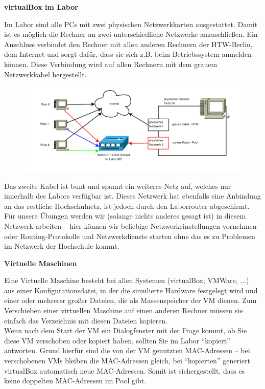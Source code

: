\documentclass[paper=a4,fontsize=11pt]{scrartcl}%
\numberwithin{equation}{section}
\begin{document}
\begin{center}
\Large{\textbf{virtualBox im Labor}}
\end{center}
Im Labor sind alle PCs mit zwei physischen Netzwerkkarten ausgestattet. Damit ist es möglich die Rechner an zwei unterschiedliche Netzwerke anzuschließen. Ein Anschluss verbindet den Rechner mit allen anderen Rechnern der HTW-Berlin, dem Internet und sorgt dafür, dass sie sich z.B. beim Betriebssystem anmelden können. Diese Verbindung wird auf allen Rechnern mit dem grauem Netzwerkkabel hergestellt.
\begin{figure}[H]
	\centering
	\includegraphics[scale=0.4]{wh_c_625}
\end{figure}
Das zweite Kabel ist bunt und spannt ein weiteres Netz auf, welches nur innerhalb des Labors verfügbar ist. Dieses Netzwerk hat ebenfalls eine Anbindung an das restliche Hochschulnetz, ist jedoch durch den Laborrouter abgeschirmt. Für unsere Übungen werden wir (solange nichts anderes gesagt ist) in diesem Netzwerk arbeiten -- hier können wir beliebige Netzwerkeinstellungen vornehmen oder Routing-Protokolle und Netzwerkdienste starten ohne das es zu Problemen im Netzwerk der Hochschule kommt.
\begin{center}
\Large{\textbf{Virtuelle Maschinen}}
\end{center}
Eine Virtuelle Maschine besteht bei allen Systemen (virtualBox, VMWare, ...) aus einer Konfigurationsdatei, in der die simulierte Hardware festgelegt wird und einer oder mehrerer großer Dateien, die als Massenspeicher der VM dienen. Zum Verschieben einer virtuellen Maschine auf einen anderen Rechner müssen sie einfach das Verzeichnis mit diesen Dateien kopieren.\\

Wenn nach dem Start der VM ein Dialogfenster mit der Frage kommt, ob Sie diese VM verschoben oder kopiert haben, sollten Sie im Labor \enquote{kopiert} antworten. Grund hierfür sind die von der VM genutzten MAC-Adressen -- bei verschobenen VMs bleiben die MAC-Adressen gleich, bei  \enquote{kopierten} generiert virtualBox automatisch neue MAC-Adressen. Somit ist sichergestellt, dass es keine doppelten MAC-Adressen im Pool gibt.\\
\end{document}
